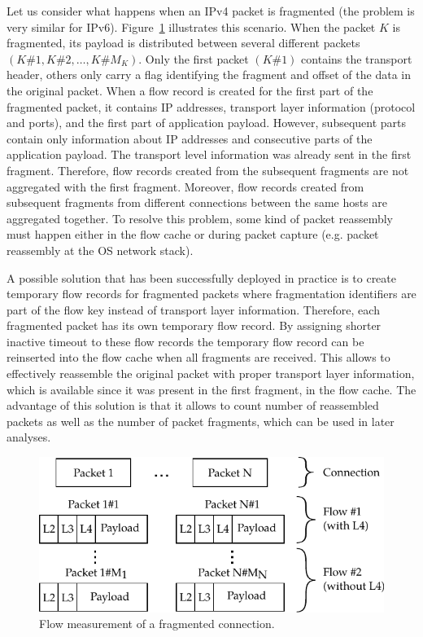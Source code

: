 Let us consider what happens when an IPv4 packet is fragmented (the problem is very similar for IPv6). Figure~\ref{fig:fragmented-flow} illustrates this scenario. When the packet $K$ is fragmented, its payload is distributed between several different packets $(K\#1, K\#2, \ldots, K\#M_K)$. Only the first packet $(K\#1)$ contains the transport header, others only carry a flag identifying the fragment and offset of the data in the original packet. When a flow record is created for the first part of the fragmented packet, it contains IP addresses, transport layer information (protocol and ports), and the first part of application payload. However, subsequent parts contain only information about IP addresses and consecutive parts of the application payload. The transport level information was already sent in the first fragment. Therefore, flow records created from the subsequent fragments are not aggregated with the first fragment. Moreover, flow records created from subsequent fragments from different connections between the same hosts are aggregated together. To resolve this problem, some kind of packet reassembly must happen either in the flow cache or during packet capture (e.g. packet reassembly at the OS network stack).

A possible solution that has been successfully deployed in practice is to create temporary flow records for fragmented packets where fragmentation identifiers are part of the flow key instead of transport layer information. Therefore, each fragmented packet has its own temporary flow record. By assigning shorter inactive timeout to these flow records the temporary flow record can be reinserted into the flow cache when all fragments are received. This allows to effectively reassemble the original packet with proper transport layer information, which is available since it was present in the first fragment, in the flow cache. The advantage of this solution is that it allows to count number of reassembled packets as well as the number of packet fragments, which can be used in later analyses.

\begin{figure}[ht!]
  \begin{center}
    \includegraphics{figures/fragmented-flow}
  \end{center}
  \caption{Flow measurement of a fragmented connection.}
  \label{fig:fragmented-flow}
\end{figure}

